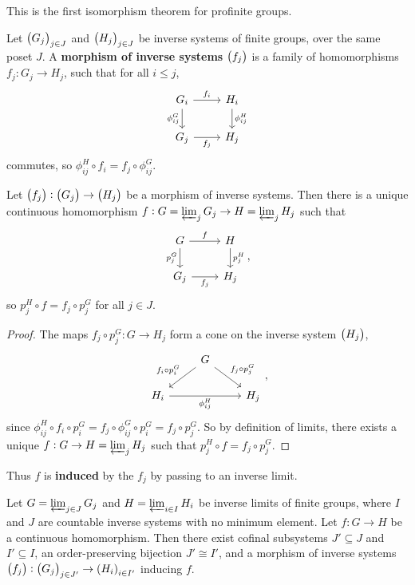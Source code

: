 This is the first isomorphism theorem for profinite groups.

\pagebreak


\begin{definition*}
Let $ \br{G_j}_{j \in J} $ and $ \br{H_j}_{j \in J} $ be inverse systems of finite groups, over the same poset $ J $. A \textbf{morphism of inverse systems} $ \br{f_j} $ is a family of homomorphisms $ f_j : G_j \to H_j $, such that for all $ i \le j $,
$$
\begin{tikzcd}
G_i \arrow{r}{f_i} \arrow{d}[swap]{\phi_{ij}^G} & H_i \arrow{d}{\phi_{ij}^H} \\
G_j \arrow{r}[swap]{f_j} & H_j
\end{tikzcd}
$$
commutes, so $ \phi_{ij}^H \circ f_i = f_j \circ \phi_{ij}^G $.
\end{definition*}

\begin{proposition}
Let $ \br{f_j} : \br{G_j} \to \br{H_j} $ be a morphism of inverse systems. Then there is a unique continuous homomorphism $ f : G = \varprojlim_j G_j \to H = \varprojlim_j H_j $ such that
$$
\begin{tikzcd}
G \arrow{r}{f} \arrow{d}[swap]{p_j^G} & H \arrow{d}{p_j^H} \\
G_j \arrow{r}[swap]{f_j} & H_j
\end{tikzcd},
$$
so $ p_j^H \circ f = f_j \circ p_j^G $ for all $ j \in J $.
\end{proposition}

\begin{proof}
The maps $ f_j \circ p_j^G : G \to H_j $ form a cone on the inverse system $ \br{H_j} $,
$$
\begin{tikzcd}
& G \arrow{dl}[swap]{f_i \circ p_i^G} \arrow{dr}{f_j \circ p_j^G} & \\
H_i \arrow{rr}[swap]{\phi_{ij}^H} & & H_j
\end{tikzcd},
$$
since $ \phi_{ij}^H \circ f_i \circ p_i^G = f_j \circ \phi_{ij}^G \circ p_i^G = f_j \circ p_j^G $. So by definition of limits, there exists a unique $ f : G \to H = \varprojlim_j H_j $ such that $ p_j^H \circ f = f_j \circ p_j^G $.
\end{proof}

Thus $ f $ is \textbf{induced} by the $ f_j $ by passing to an inverse limit.

\begin{proposition}
\label{prop:2.4.11}
Let $ G = \varprojlim_{j \in J} G_j $ and $ H = \varprojlim_{i \in I} H_i $ be inverse limits of finite groups, where $ I $ and $ J $ are countable inverse systems with no minimum element. Let $ f : G \to H $ be a continuous homomorphism. Then there exist cofinal subsystems $ J' \subseteq J $ and $ I' \subseteq I $, an order-preserving bijection $ J' \cong I' $, and a morphism of inverse systems $ \br{f_j} : \br{G_j}_{j \in J'} \to \br{H_i}_{i \in I'} $ inducing $ f $.
\end{proposition}

